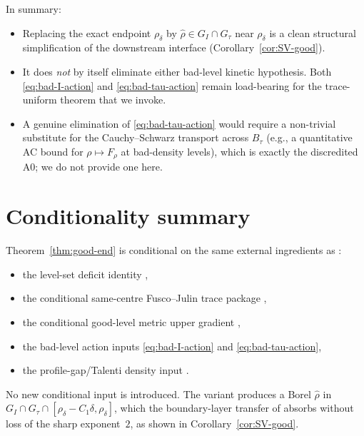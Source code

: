 \documentclass[11pt]{article}
\theoremstyle{definition}
\newcommand{\rdel}{\rho_\delta}
\newcommand{\rhad}{\widehat\rho}
\begin{document}
In summary:
\begin{itemize}
\item Replacing the exact endpoint $\rdel$ by $\rhad\in G_I\cap G_\tau$
near $\rdel$ is a clean structural simplification of the
downstream interface (Corollary~\ref{cor:SV-good}).
\item It does \emph{not} by itself eliminate either bad-level kinetic
hypothesis.  Both \eqref{eq:bad-I-action} and
\eqref{eq:bad-tau-action} remain load-bearing for the trace-uniform
theorem that we invoke.
\item A genuine elimination of \eqref{eq:bad-tau-action} would require
a non-trivial substitute for the Cauchy--Schwarz transport across
$B_\tau$ (e.g., a quantitative AC bound for
$\rho\mapsto F_\rho$ at bad-density levels), which is exactly the
discredited A0; we do not provide one here.
\end{itemize}

\section{Conditionality summary}\label{sec:cond}

Theorem~\ref{thm:good-end} is conditional on the same external
ingredients as \cite[Thm.~3.3]{WeightedMetricTrace}:
\begin{itemize}
\item the level-set deficit identity \cite{LevelSetIdentity},
\item the conditional same-centre Fusco--Julin trace package
\cite[Hyp.~3.5]{WeightedMetricTrace},
\item the conditional good-level metric upper gradient
\cite[Hyp.~3.6]{WeightedMetricTrace},
\item the bad-level action inputs \eqref{eq:bad-I-action} and
\eqref{eq:bad-tau-action},
\item the profile-gap/Talenti density input
\cite[Hyp.~3.7]{WeightedMetricTrace}.
\end{itemize}
No new conditional input is introduced.  The variant produces a Borel
$\rhad$ in $G_I\cap G_\tau\cap[\rdel-C_1\delta,\rdel]$, which the
boundary-layer transfer of \cite{BoundaryLayerTransfer} absorbs without
loss of the sharp exponent~$2$, as shown in Corollary~\ref{cor:SV-good}.
\end{document}
